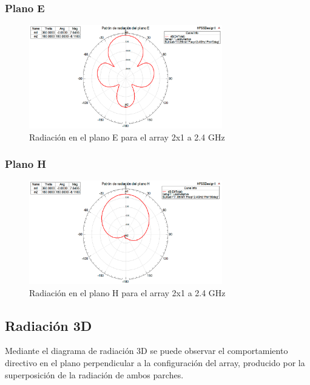 \subsubsection{Plano E}
\begin{figure}[H]
    \centering
        \includegraphics[width=0.75\textwidth]{archivos/analisis/2x11/4}
        \caption{Radiación en el plano E para el array 2x1 a 2.4 GHz}
        \label{fig:E2x11}
\end{figure}

\subsubsection{Plano H}
\begin{figure}[H]
    \centering
        \includegraphics[width=0.75\textwidth]{archivos/analisis/2x11/5}
        \caption{Radiación en el plano H para el array 2x1 a 2.4 GHz}
        \label{fig:H2x11}
\end{figure}

\subsection{Radiación 3D}
\par Mediante el diagrama de radiación 3D se puede observar el comportamiento directivo en el plano perpendicular a la configuración del array, producido por la superposición de la radiación de ambos parches.

